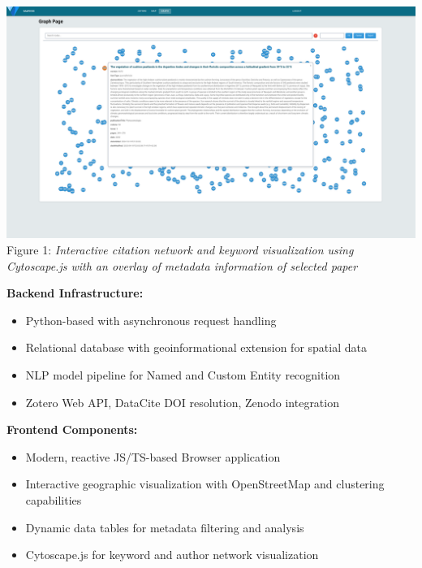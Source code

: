 \documentclass[a0,portrait]{a0poster}
\begin{document}
\begin{multicols}{3}
	\begin{center}
		\includegraphics[width=0.9\linewidth]{graph-view}\\
		\vspace{0.2cm}
		{\small Figure 1: \textit{Interactive citation network and keyword visualization using Cytoscape.js with an overlay of metadata
    information of selected paper}}
	\end{center}

	\vspace{0.5cm}

	\begin{tcolorbox}[mainbox, title={\Large\textbf{Technical Architecture}}]
		\vspace{0.5cm}
		\textbf{Backend Infrastructure:}
		\begin{itemize}[leftmargin=*]
			\item Python-based with asynchronous request handling
			\item Relational database with geoinformational extension for spatial data
			\item NLP model pipeline for Named and Custom Entity recognition
			\item Zotero Web API, DataCite DOI resolution, Zenodo integration
		\end{itemize}

		\textbf{Frontend Components:}
		\begin{itemize}[leftmargin=*]
			\item Modern, reactive JS/TS-based Browser application
			\item Interactive geographic visualization with OpenStreetMap and clustering capabilities
			\item Dynamic data tables for metadata filtering and analysis
			\item Cytoscape.js for keyword and author network visualization
		\end{itemize}


\end{tcolorbox}
\end{multicols}
\end{document}

